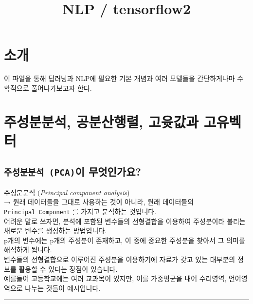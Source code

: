 \documentclass[
]{article}
\title{NLP / tensorflow2}
\author{}
\date{\vspace{-2.5em}}
\begin{document}
\maketitle

\hypertarget{uxc18cuxac1c}{%
\section{소개}\label{uxc18cuxac1c}}

이 파일을 통해 딥러닝과 NLP에 필요한 기본 개념과 여러 모델들을
간단하게나마 수학적으로 풀어나가보고자 한다.

\hypertarget{uxc8fcuxc131uxbd84uxbd84uxc11d-uxacf5uxbd84uxc0b0uxd589uxb82c-uxace0uxc733uxac12uxacfc-uxace0uxc720uxbca1uxd130}{%
\section{주성분분석, 공분산행렬, 고윳값과
고유벡터}\label{uxc8fcuxc131uxbd84uxbd84uxc11d-uxacf5uxbd84uxc0b0uxd589uxb82c-uxace0uxc733uxac12uxacfc-uxace0uxc720uxbca1uxd130}}

\hypertarget{uxc8fcuxc131uxbd84uxbd84uxc11d-pcauxc774-uxbb34uxc5c7uxc778uxac00uxc694}{%
\subsection{\texorpdfstring{\texttt{주성분분석\ (PCA)}이
무엇인가요?}{주성분분석 (PCA)이 무엇인가요?}}\label{uxc8fcuxc131uxbd84uxbd84uxc11d-pcauxc774-uxbb34uxc5c7uxc778uxac00uxc694}}

주성분분석 (\emph{Principal component analysis})\\
→ 원래 데이터들을 그대로 사용하는 것이 아니라, 원래 데이터들의
\texttt{Principal\ Component} 를 가지고 분석하는 것입니다.\\
어려운 말로 쓰자면, 분석에 포함된 변수들의 선형결합을 이용하여
주성분이라 불리는 새로운 변수를 생성하는 방법입니다.\\
p개의 변수에는 p개의 주성분이 존재하고, 이 중에 중요한 주성분을 찾아서
그 의미를 해석하게 됩니다.\\
변수들의 선형결합으로 이루어진 주성분을 이용하기에 자료가 갖고 있는
대부분의 정보를 활용할 수 있다는 장점이 있습니다.\\
예를들어 고등학교에는 여러 교과목이 있지만, 이를 가중평균을 내어
수리영역, 언어영역으로 나누는 것들이 예시입니다.

\begin{center}\rule{0.5\linewidth}{0.5pt}\end{center}
\end{document}
